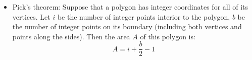 \begin{itemize}
\item Pick's theorem: Suppose that a polygon has integer coordinates for all of its vertices. Let 
$i$ be the number of integer points interior to the polygon, $b$ be the number of integer points on its boundary (including both vertices and points along the sides). Then the area $A$ of this polygon is:
$$ A = i + \frac{b}{2} - 1$$
\end{itemize}
